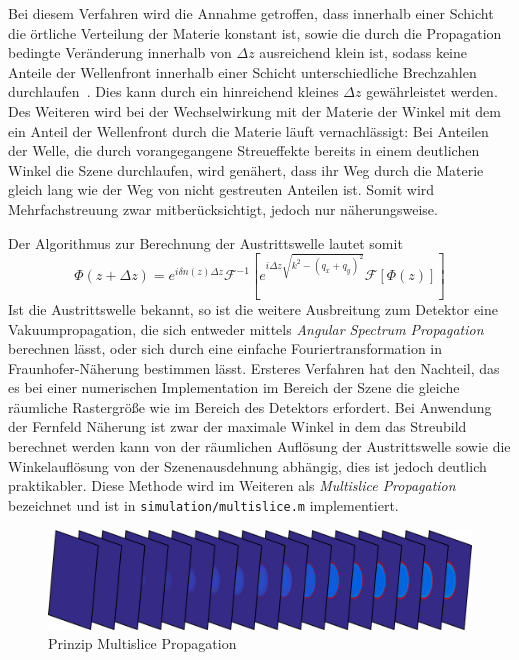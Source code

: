 Bei diesem Verfahren wird die Annahme getroffen, dass  innerhalb einer Schicht die örtliche Verteilung der Materie konstant ist, sowie die durch die Propagation bedingte Veränderung innerhalb von $\Delta z$ ausreichend klein ist, sodass keine Anteile der Wellenfront innerhalb einer Schicht unterschiedliche Brechzahlen durchlaufen~\cite{hare1994}. Dies kann durch ein hinreichend kleines $\Delta z$ gewährleistet werden. 
Des Weiteren wird bei der Wechselwirkung mit der Materie der Winkel mit dem ein Anteil der Wellenfront durch die Materie läuft vernachlässigt: Bei Anteilen der Welle, die durch vorangegangene Streueffekte bereits in einem deutlichen Winkel die Szene durchlaufen, wird genähert, dass ihr Weg durch die Materie gleich lang wie der Weg von nicht gestreuten Anteilen ist. Somit wird Mehrfachstreuung zwar mitberücksichtigt, jedoch nur näherungsweise.
	
Der Algorithmus zur Berechnung der Austrittswelle lautet somit
\begin{equation}
	\label{eq:multislice}
	\Phi(z+\Delta z)= e^{i\delta n\left(z\right) \Delta z}\mathscr{F}^{-1}\left[e^{i\Delta z\sqrt{k^2-(q_x+q_y)^2}}\mathscr{F}\left[\Phi(z)\right]\right]
\end{equation}
Ist die Austrittswelle bekannt, so ist die weitere Ausbreitung zum Detektor eine Vakuumpropagation, die sich entweder mittels \textit{Angular Spectrum Propagation} berechnen lässt, oder sich durch eine einfache Fouriertransformation in Fraunhofer-Näherung bestimmen lässt. Ersteres Verfahren hat den Nachteil, das es bei einer numerischen Implementation im Bereich der Szene die gleiche räumliche Rastergröße wie im Bereich des Detektors erfordert. Bei Anwendung der Fernfeld Näherung ist zwar der maximale Winkel in dem das Streubild berechnet werden kann von der räumlichen Auflösung der Austrittswelle sowie die Winkelauflösung von der Szenenausdehnung abhängig, dies ist jedoch deutlich praktikabler.
Diese Methode wird im Weiteren als \textit{Multislice Propagation} bezeichnet und ist in \texttt{simulation/multislice.m} implementiert.

\begin{figure}
	\centering
	\includegraphics[width=1\textwidth]{images/slice_multislice.png}
	\caption[Prinzip MSFT]{Prinzip Multislice Propagation}
	\label{fig:msft}
\end{figure} 
	
